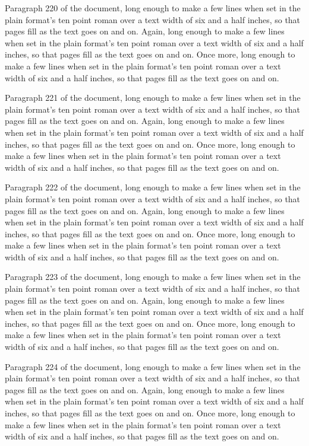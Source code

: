 Paragraph 220 of the document, long enough to make a few lines when set in the plain format's ten point roman over a text width of six and a half inches, so that pages fill as the text goes on and on. Again, long enough to make a few lines when set in the plain format's ten point roman over a text width of six and a half inches, so that pages fill as the text goes on and on. Once more, long enough to make a few lines when set in the plain format's ten point roman over a text width of six and a half inches, so that pages fill as the text goes on and on.

Paragraph 221 of the document, long enough to make a few lines when set in the plain format's ten point roman over a text width of six and a half inches, so that pages fill as the text goes on and on. Again, long enough to make a few lines when set in the plain format's ten point roman over a text width of six and a half inches, so that pages fill as the text goes on and on. Once more, long enough to make a few lines when set in the plain format's ten point roman over a text width of six and a half inches, so that pages fill as the text goes on and on.

Paragraph 222 of the document, long enough to make a few lines when set in the plain format's ten point roman over a text width of six and a half inches, so that pages fill as the text goes on and on. Again, long enough to make a few lines when set in the plain format's ten point roman over a text width of six and a half inches, so that pages fill as the text goes on and on. Once more, long enough to make a few lines when set in the plain format's ten point roman over a text width of six and a half inches, so that pages fill as the text goes on and on.

Paragraph 223 of the document, long enough to make a few lines when set in the plain format's ten point roman over a text width of six and a half inches, so that pages fill as the text goes on and on. Again, long enough to make a few lines when set in the plain format's ten point roman over a text width of six and a half inches, so that pages fill as the text goes on and on. Once more, long enough to make a few lines when set in the plain format's ten point roman over a text width of six and a half inches, so that pages fill as the text goes on and on.

Paragraph 224 of the document, long enough to make a few lines when set in the plain format's ten point roman over a text width of six and a half inches, so that pages fill as the text goes on and on. Again, long enough to make a few lines when set in the plain format's ten point roman over a text width of six and a half inches, so that pages fill as the text goes on and on. Once more, long enough to make a few lines when set in the plain format's ten point roman over a text width of six and a half inches, so that pages fill as the text goes on and on.

